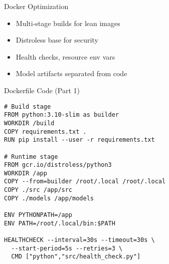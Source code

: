 \documentclass[aspectratio=169]{beamer}
\begin{document}

\begin{frame}{Docker Optimization}


\begin{itemize}
\item Multi-stage builds for lean images
\item Distroless base for security
\item Health checks, resource env vars
\item Model artifacts separated from code
\end{itemize}
\end{frame}


\begin{frame}[fragile]{Dockerfile Code (Part 1)}
\begin{verbatim}
# Build stage
FROM python:3.10-slim as builder
WORKDIR /build
COPY requirements.txt .
RUN pip install --user -r requirements.txt

# Runtime stage
FROM gcr.io/distroless/python3
WORKDIR /app
COPY --from=builder /root/.local /root/.local
COPY ./src /app/src
COPY ./models /app/models

ENV PYTHONPATH=/app
ENV PATH=/root/.local/bin:$PATH

HEALTHCHECK --interval=30s --timeout=30s \
  --start-period=5s --retries=3 \
  CMD ["python","src/health_check.py"]
\end{verbatim}
\end{frame}
\end{document}
